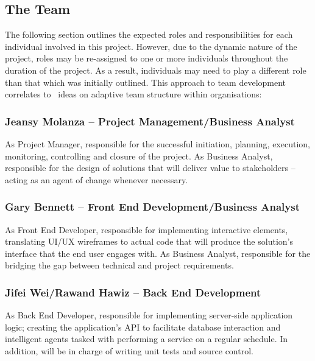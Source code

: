\subsection{The Team}

The following section outlines the expected roles and responsibilities for each individual involved in this project. However, due to the dynamic nature of the project, roles may be re-assigned to one or more individuals throughout the duration of the project. As a result, individuals may need to play a different role than that which was initially outlined. This approach to team development correlates to~\textcite{book:xteams} ideas on adaptive team structure within organisations:

\subsubsection{Jeansy Molanza -- Project Management/Business Analyst}

As Project Manager, responsible for the successful initiation, planning, execution, monitoring, controlling and closure of the project. As Business Analyst, responsible for the design of solutions that will deliver value to stakeholders -- acting as an agent of change whenever necessary.

\subsubsection{Gary Bennett -- Front End Development/Business Analyst}

As Front End Developer, responsible for implementing interactive elements, translating UI/UX wireframes to actual code that will produce the solution's interface that the end user engages with. As Business Analyst, responsible for the bridging the gap between technical and project requirements.

\subsubsection{Jifei Wei/Rawand Hawiz -- Back End Development}

As Back End Developer, responsible for implementing server-side application logic; creating the application's API to facilitate database interaction and intelligent agents tasked with performing a service on a regular schedule. In addition, will be in charge of writing unit tests and source control.
